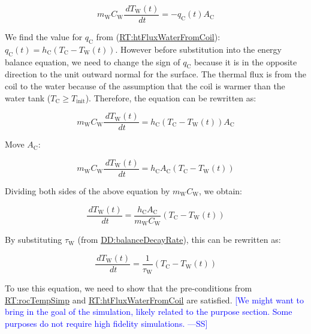 \documentclass[12pt]{article}
\newcommand{\authornote}[3]{\textcolor{#1}{[#3 ---#2]}}
\newcommand{\authornote}[3]{}
\newcommand{\wss}[1]{\authornote{blue}{SS}{#1}}
\begin{document}
\begin{displaymath}
m_\text{W} C_\text{W} \frac{\,dT_\text{W}(t)}{\,dt} = -{q_\text{C}(t)} {A_\text{C}}
\end{displaymath}
        
We find the value for ${q_{\text{C}}}$ from
(\hyperref[RT:htFluxWaterFromCoil]{RT:htFluxWaterFromCoil}):
${q_{\text{C}}(t)}={h_{\text{C}}}
\left({T_{\text{C}}}-{T_{\text{W}}}\left(t\right)\right)$.  However before
substitution into the energy balance equation, we need to change the sign of
${q_{\text{C}}}$ because it is in the opposite direction to the unit outward
normal for the surface.  The thermal flux is from the coil to the water because
of the assumption that the coil is warmer than the water tank ($T_\text{C} \geq
T_\text{init}$).  Therefore, the equation can be rewritten as:

\begin{displaymath}
m_\text{W} C_\text{W} \frac{\,dT_\text{W}(t)}{\,dt} = {h_{\text{C}}}
\left({T_{\text{C}}}-{T_{\text{W}}}\left(t\right)\right) {A_\text{C}}
\end{displaymath}
        
Move $A_\text{C}$:

\begin{displaymath}
m_\text{W} C_\text{W} \frac{\,dT_\text{W}(t)}{\,dt} = {h_{\text{C}}} {A_\text{C}}
\left({T_{\text{C}}}-{T_{\text{W}}}\left(t\right)\right) 
\end{displaymath}
        
Dividing both sides of the above equation by ${m_{\text{W}}} {C_{\text{W}}}$, we
obtain:

\begin{displaymath}
\frac{\,d{T_{\text{W}}}(t)}{\,dt}=\frac{{h_{\text{C}}} {A_{\text{C}}}}{{m_{\text{W}}} {C_{\text{W}}}} \left({T_{\text{C}}}-{T_{\text{W}}(t)}\right)
\end{displaymath}

By substituting ${τ_{\text{W}}}$ (from \hyperref[DD:balanceDecayRate]{DD:balanceDecayRate}), this can be rewritten as:

\begin{displaymath}
\frac{\,d{T_{\text{W}}}(t)}{\,dt}=\frac{1}{{τ_{\text{W}}}} \left({T_{\text{C}}}-{T_{\text{W}}(t)}\right)
\end{displaymath}

To use this equation, we need to show that the pre-conditions from
\hyperref[RT:rocTempSimp]{RT:rocTempSimp} and
\hyperref[RT:htFluxWaterFromCoil]{RT:htFluxWaterFromCoil} are satisfied. \wss{We
might want to bring in the goal of the simulation, likely related to the purpose
section.  Some purposes do not require high fidelity simulations.}
\end{document}
